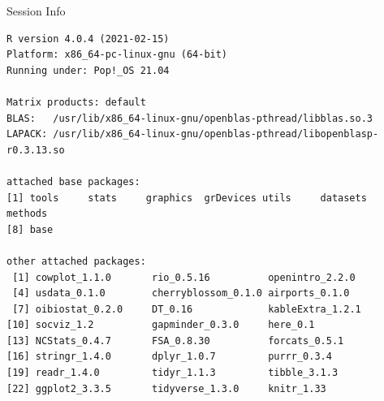\documentclass[10pt]{beamer}\usepackage[]{graphicx}\usepackage[]{color}
\makeatletter
\newenvironment{kframe}{%
 \def\at@end@of@kframe{}%
 \ifinner\ifhmode%
  \def\at@end@of@kframe{\end{minipage}}%
  \begin{minipage}{\columnwidth}%
 \fi\fi%
 \def\FrameCommand##1{\hskip\@totalleftmargin \hskip-\fboxsep
 \colorbox{shadecolor}{##1}\hskip-\fboxsep
     \hskip-\linewidth \hskip-\@totalleftmargin \hskip\columnwidth}%
 \MakeFramed {\advance\hsize-\width
   \@totalleftmargin\z@ \linewidth\hsize
   \@setminipage}}%
 {\par\unskip\endMakeFramed%
 \at@end@of@kframe}
\newenvironment{knitrout}{}{} %
\makeatother
\begin{document}
	\begin{frame}[fragile]{Session Info}
	\tiny
	
\begin{knitrout}\tiny
{}\color{fgcolor}\begin{kframe}
\begin{verbatim}
R version 4.0.4 (2021-02-15)
Platform: x86_64-pc-linux-gnu (64-bit)
Running under: Pop!_OS 21.04

Matrix products: default
BLAS:   /usr/lib/x86_64-linux-gnu/openblas-pthread/libblas.so.3
LAPACK: /usr/lib/x86_64-linux-gnu/openblas-pthread/libopenblasp-r0.3.13.so

attached base packages:
[1] tools     stats     graphics  grDevices utils     datasets  methods  
[8] base     

other attached packages:
 [1] cowplot_1.1.0       rio_0.5.16          openintro_2.2.0    
 [4] usdata_0.1.0        cherryblossom_0.1.0 airports_0.1.0     
 [7] oibiostat_0.2.0     DT_0.16             kableExtra_1.2.1   
[10] socviz_1.2          gapminder_0.3.0     here_0.1           
[13] NCStats_0.4.7       FSA_0.8.30          forcats_0.5.1      
[16] stringr_1.4.0       dplyr_1.0.7         purrr_0.3.4        
[19] readr_1.4.0         tidyr_1.1.3         tibble_3.1.3       
[22] ggplot2_3.3.5       tidyverse_1.3.0     knitr_1.33         


\end{verbatim}
\end{kframe}
\end{knitrout}
\end{frame}
\end{document}
